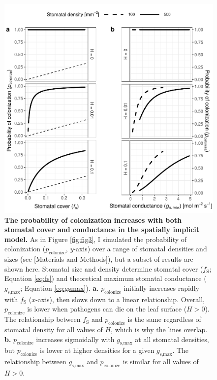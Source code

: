 \documentclass[utf8]{frontiersSCNS}
\newcommand{\fs}{$f_\text{S}$}
\newcommand{\gsmax}{$g_\text{s,max}$}
\begin{document}
\begin{figure}
  \centering
    \includegraphics{../figures/figS2.pdf}
    \caption{\textbf{The probability of colonization increases with both stomatal cover and conductance in the spatially implicit model.} As in Figure \ref{fig:fig3}, I simulated the probability of colonization ($p_\text{colonize}$, $y$-axis) over a range of stomatal densities and sizes (see [Materials and Methods]), but a subset of results are shown here. Stomatal size and density determine stomatal cover (\fs; Equation \ref{eq:fs}) and theoretical maximum stomatal conductance (\gsmax; Equation \ref{eq:gsmax}). \textbf{a.} $p_\text{colonize}$ initially increases rapidly with \fs{} ($x$-axis), then slows down to a linear relationship. Overall, $p_\text{colonize}$ is lower when pathogens can die on the leaf surface ($H > 0$). The relationship between \fs{} and $p_\text{colonize}$ is the same regardless of stomatal density for all values of $H$, which is why the lines overlap. \textbf{b.} $p_\text{colonize}$ increases sigmoidally with \gsmax{} at all stomatal densities, but $p_\text{colonize}$ is lower at higher densities for a given \gsmax. The relationship between \gsmax{} and $p_\text{colonize}$ is similar for all values of $H > 0$.}
    \label{fig:figS2}
\end{figure}
\end{document}

